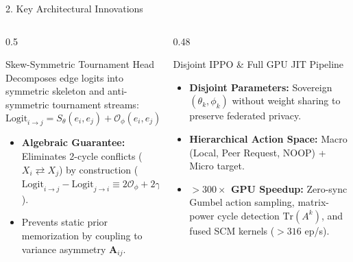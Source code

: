 \documentclass[aspectratio=169, 10pt]{beamer}
\begin{document}
\begin{frame}{2. Key Architectural Innovations}
  \begin{columns}[T]
    \begin{column}{0.5\textwidth}
      \begin{block}{Skew-Symmetric Tournament Head}
        Decomposes edge logits into symmetric skeleton and anti-symmetric tournament streams:
        $$\text{Logit}_{i \to j} = S_\theta(e_i, e_j) + \mathcal{O}_\phi(e_i, e_j) + \gamma \mathbf{A}_{ij}$$
        \begin{itemize}
          \item \textbf{Algebraic Guarantee:} Eliminates 2-cycle conflicts ($X_i \rightleftarrows X_j$) by construction ($\text{Logit}_{i \to j} - \text{Logit}_{j \to i} \equiv 2\mathcal{O}_\phi + 2\gamma \mathbf{A}_{ij}$).
          \item Prevents static prior memorization by coupling to variance asymmetry $\mathbf{A}_{ij}$.
        \end{itemize}
      \end{block}
    \end{column}

    \begin{column}{0.48\textwidth}
      \begin{block}{Disjoint IPPO \& Full GPU JIT Pipeline}
        \begin{itemize}
          \item \textbf{Disjoint Parameters:} Sovereign $(\theta_k, \phi_k)$ without weight sharing to preserve federated privacy.
          \item \textbf{Hierarchical Action Space:} Macro (Local, Peer Request, NOOP) + Micro target.
          \item \textbf{$>300\times$ GPU Speedup:} Zero-sync Gumbel action sampling, matrix-power cycle detection $\text{Tr}(A^k)$, and fused SCM kernels ($>316$ ep/s).
        \end{itemize}
      \end{block}
    \end{column}
  \end{columns}
\end{frame}
\end{document}
